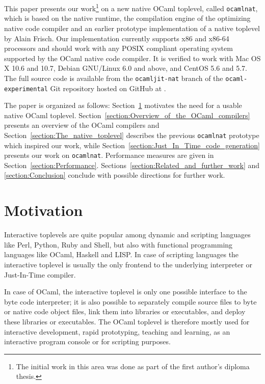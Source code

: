 \documentclass[10pt,a4paper,final,twocolumn]{article}
\begin{document}
This paper presents our work\footnote{The initial work in this area was done as part of the first
author's diploma thesis.} on a new native OCaml toplevel, called \texttt{ocamlnat}, which is
based on the native runtime, the compilation engine of the optimizing native code compiler and
an earlier prototype implementation of a native toplevel by Alain Frisch. Our implementation
currently supports x86 and x86-64 processors \cite{Amd09Vol1,Intel10Vol1} and should work with any
POSIX compliant operating system supported by the OCaml native code compiler. It is verified to
work with Mac OS X 10.6 and 10.7, Debian GNU/Linux 6.0 and above, and CentOS 5.6 and 5.7. The
full source code is available from the \texttt{ocamljit-nat} branch of the \texttt{ocaml-experimental}
Git repository hosted on GitHub at \cite{Meurer11ocamlexperimental}.

The paper is organized as follows: Section~\ref{section:Motivation} motivates the need for a
usable native OCaml toplevel. Section~\ref{section:Overview_of_the_OCaml_compilers} presents
an overview of the OCaml compilers and Section~\ref{section:The_native_toplevel} describes the
previous \texttt{ocamlnat} prototype which inspired our work, while
Section~\ref{section:Just_In_Time_code_generation} presents our work on \texttt{ocamlnat}.
Performance measures are given in Section~\ref{section:Performance}.
Sections~\ref{section:Related_and_further_work} and \ref{section:Conclusion} conclude with
possible directions for further work.


\section{Motivation} \label{section:Motivation}

Interactive toplevels are quite popular among dynamic and scripting languages like Perl, Python, Ruby
and Shell, but also with functional programming languages like OCaml, Haskell and LISP. In case of
scripting languages the interactive toplevel is usually the only frontend to the underlying interpreter
or Just-In-Time compiler.

In case of OCaml, the interactive toplevel is only one possible interface to the byte code interpreter;
it is also possible to separately compile source files to byte or native code object files, link them
into libraries or executables,
and deploy these libraries or executables. The OCaml toplevel is therefore mostly used for
interactive development, rapid prototyping, teaching and learning, as an interactive program console
or for scripting purposes.
\end{document}
